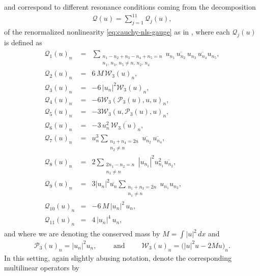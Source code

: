 \documentclass[11pt, xcolor = dvipsnames,reqno
]{amsart}
\theoremstyle{definition}
\theoremstyle{remark}
\begin{document}
and correspond to different resonance conditions coming from the decomposition 
\begin{align}
    \mathcal{Q}(u) = \sum_{j=1}^{11} \mathcal{Q}_j(u),
\end{align}
of the renormalized nonlinearity \eqref{eq:cauchy-nls-gauge} as in \cite{NahmodStaffilani2015}, 
where each $\mathcal Q_j(u)$ is defined as
\begin{align}\label{eq:qnl-fcoeff}
\begin{array}{rcl}
    \mathcal{Q}_1(u)_n  & = & \sum_{ \substack{  n_1 - n_2 + n_3 - n_4 + n_5 = n \\ n_1, \, n_3, \, n_5 \neq n,  \, n_2, \, n_4  } } u_{n_1} \, \overline{u_{n_2}} \, u_{n_3} \, \overline{u_{n_4}} u_{n_5}, \\
    \mathcal{Q}_2(u)_n & = & 
     6 \, M \, \mathcal W_3(u)_n, \\
    \mathcal{Q}_3(u)_n & = & 
    - 6 \, |u_n|^2 \mathcal W_3(u)_n, \\
    \mathcal{Q}_4(u)_n & = & - 6 \mathcal W_3(\mathcal P_3(u),u,u)_n, \\
    \mathcal{Q}_5(u)_n  & = & - 3 \mathcal W_3(u,\mathcal P_3(u),u)_n, \\
    \mathcal{Q}_6(u)_n & = & 
    - 3\, u_n^2 \, \overline{\mathcal W_3(u)_n}, \\
    \mathcal{Q}_7(u)_n & = & u_n^3 \sum_{  \substack{n_2 + n_4 = 2n \\ n_2 \neq n } } \overline{u_{n_2}} \, \overline{u_{n_4}}, \\
    \mathcal{Q}_8(u)_n & = & 2 \sum_{ \substack{ 2n_1 - n_2 = n \\ n_1 \neq n } } |u_{n_1}|^2 u_{n_1}^2 \overline{u_{n_2}}, \\
    \mathcal{Q}_9(u)_n & = & 3 |u_n|^2 \overline{u_n} \sum_{ \substack{ n_1 + n_3 = 2n \\ n_1 \neq n } } u_{n_1} u_{n_3}, \\
    \mathcal{Q}_{10}(u)_n & = &
    - 6\, M \, |u_n|^2 \,  u_n, \\
    \mathcal{Q}_{11}(u)_n & = & 4\, |u_n|^4 \, u_n,
\end{array}
\end{align}
and where we are denoting the conserved mass by $M = \int |u|^2 \, dx$ and 
\begin{align}
    \mathcal P_3(u)_n = |u_n|^2 u_n, 
    \qquad \text{ and } \qquad 
    \mathcal W_3(u)_n = \big( |u|^2u  - 2 M u \big)_n. 
\end{align}
In this setting, again slightly abusing notation, denote the corresponding multilinear operators by
\end{document}

